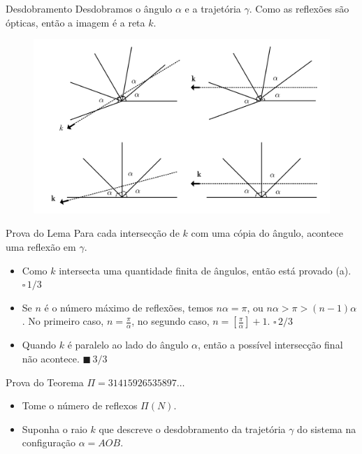 \documentclass{beamer}
\begin{document}
\begin{frame}{Desdobramento}
  Desdobramos o ângulo $\alpha$ e a trajetória $\gamma$. Como as reflexões são ópticas, então a imagem é a reta $k$.
  \begin{figure}
    \centering
    \includegraphics[width=1\textwidth]{images/image-5.png}
  \end{figure}
\end{frame}

\begin{frame}{Prova do Lema}
  Para cada intersecção de $k$ com uma cópia do ângulo, acontece uma reflexão em $\gamma$.
  
  \begin{itemize}
    \item Como $k$ intersecta uma quantidade finita de ângulos, então está provado (a). $\square \, 1/3$
    \item Se $n$ é o número máximo de reflexões, temos $n\alpha=\pi$, ou $n\alpha >\pi>(n-1)\alpha$. No primeiro caso, $n = \frac{\pi}{\alpha}$, no segundo caso, $n = [\frac{\pi}{\alpha}]+1$. $\square \, 2/3$
    \item Quando $k$ é paralelo ao lado do ângulo $\alpha$, então a possível intersecção final não acontece. $\blacksquare \, 3/3$
  \end{itemize}

\end{frame}

\begin{frame}{Prova do Teorema $\Pi=31415926535897\dots$}
    \begin{itemize}
      \item Tome o número de reflexos $\Pi(N)$.
      \item Suponha o raio $k$ que descreve o desdobramento da trajetória $\gamma$ do sistema na configuração $\alpha = AOB$.
    \end{itemize}
\end{frame}
\end{document}
